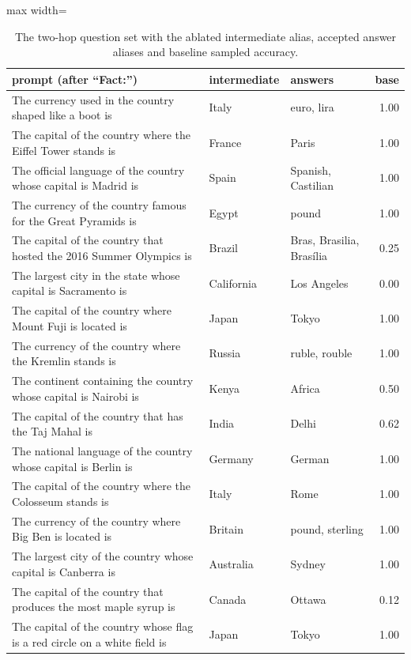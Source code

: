 \begin{table}[t]
\centering
\footnotesize
\caption{The two-hop question set with the ablated intermediate alias, accepted answer aliases and baseline sampled accuracy.}
\label{tab:multihop}
\begin{adjustbox}{max width=\textwidth}
\begin{tabular}{p{7.5cm}llr}
\toprule
prompt (after ``Fact:'') & intermediate & answers & base \\
\midrule
The currency used in the country shaped like a boot is & Italy & euro, lira & 1.00 \\
The capital of the country where the Eiffel Tower stands is & France & Paris & 1.00 \\
The official language of the country whose capital is Madrid is & Spain & Spanish, Castilian & 1.00 \\
The currency of the country famous for the Great Pyramids is & Egypt & pound & 1.00 \\
The capital of the country that hosted the 2016 Summer Olympics is & Brazil & Bras, Brasilia, Brasília & 0.25 \\
The largest city in the state whose capital is Sacramento is & California & Los Angeles & 0.00 \\
The capital of the country where Mount Fuji is located is & Japan & Tokyo & 1.00 \\
The currency of the country where the Kremlin stands is & Russia & ruble, rouble & 1.00 \\
The continent containing the country whose capital is Nairobi is & Kenya & Africa & 0.50 \\
The capital of the country that has the Taj Mahal is & India & Delhi & 0.62 \\
The national language of the country whose capital is Berlin is & Germany & German & 1.00 \\
The capital of the country where the Colosseum stands is & Italy & Rome & 1.00 \\
The currency of the country where Big Ben is located is & Britain & pound, sterling & 1.00 \\
The largest city of the country whose capital is Canberra is & Australia & Sydney & 1.00 \\
The capital of the country that produces the most maple syrup is & Canada & Ottawa & 0.12 \\
The capital of the country whose flag is a red circle on a white field is & Japan & Tokyo & 1.00 \\

\end{tabular}
\end{adjustbox}
\end{table}
